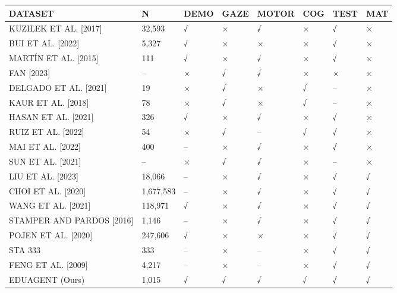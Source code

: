 \begin{tabular}{llllllll}
\toprule
DATASET & N & DEMO & GAZE & MOTOR & COG & TEST & MAT \\
\midrule
KUZILEK ET AL. [2017] & 32,593 & √ & × & √ & × & √ & × \\
BUI ET AL. [2022] & 5,327 & √ & × & × & × & √ & × \\
MARTÍN ET AL. [2015] & 111 & √ & × & √ & × & √ & × \\
FAN [2023] & – & × & √ & √ & × & × & × \\
DELGADO ET AL. [2021] & 19 & × & √ & × & √ & – & × \\
KAUR ET AL. [2018] & 78 & × & √ & × & √ & – & × \\
HASAN ET AL. [2021] & 326 & √ & × & √ & × & √ & × \\
RUIZ ET AL. [2022] & 54 & × & √ & – & √ & √ & × \\
MAI ET AL. [2022] & 400 & – & × & √ & × & √ & × \\
SUN ET AL. [2021] & – & × & √ & √ & × & – & × \\
LIU ET AL. [2023] & 18,066 & – & × & √ & × & √ & √ \\
CHOI ET AL. [2020] & 1,677,583 & – & × & √ & × & √ & √ \\
WANG ET AL. [2021] & 118,971 & √ & × & √ & × & √ & √ \\
STAMPER AND PARDOS [2016] & 1,146 & – & × & √ & × & √ & √ \\
POJEN ET AL. [2020] & 247,606 & √ & × & × & × & √ & √ \\
STA 333 & 333 & – & × & – & × & √ & √ \\
FENG ET AL. [2009] & 4,217 & – & × & – & × & √ & √ \\
EDUAGENT (Ours) & 1,015 & √ & √ & √ & √ & √ & √ \\
\bottomrule
\end{tabular}
